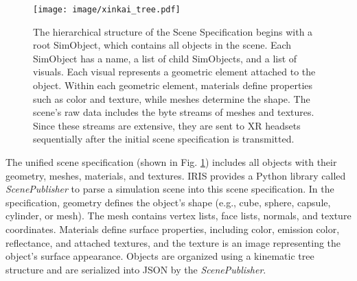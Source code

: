 \begin{figure}[t]
    \centering
    \texttt{[image: image/xinkai\_tree.pdf]}
    \caption{
The hierarchical structure of the Scene Specification begins with a root SimObject, which contains all objects in the scene. Each SimObject has a name, a list of child SimObjects, and a list of visuals. Each visual represents a geometric element attached to the object.
Within each geometric element, materials define properties such as color and texture, while meshes determine the shape. The scene's raw data includes the byte streams of meshes and textures. Since these streams are extensive, they are sent to XR headsets sequentially after the initial scene specification is transmitted.
}
    \label{fig:scene_specification}
\end{figure}


The unified scene specification (shown in Fig. \ref{fig:scene_specification}) includes all objects with their geometry, meshes, materials, and textures. 
IRIS provides a Python library called \textit{ScenePublisher} to parse a simulation scene into this scene specification.
In the specification, 
geometry defines the object's shape (e.g., cube, sphere, capsule, cylinder, or mesh).
The mesh contains vertex lists, face lists, normals, and texture coordinates. 
Materials define surface properties, including color, emission color, reflectance, and attached textures, 
and the texture is an image representing the object's surface appearance.
Objects are organized using a kinematic tree structure and are serialized into JSON by the \textit{ScenePublisher}.

